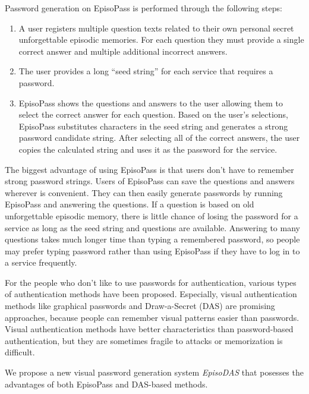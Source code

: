 \documentclass[sigconf]{acmart}
\begin{document}
Password generation on EpisoPass is performed through the following steps:

\begin{enumerate}
\item A user registers multiple question texts related to their own personal
secret unforgettable episodic memories. For each question they must provide
a single correct answer and multiple additional incorrect answers.

\item The user provides a long ``seed string'' for each service that requires
a password.

\item EpisoPass shows the questions and answers to the user allowing
them to select the correct answer for each question.
Based on the user's selections,
EpisoPass substitutes characters in the seed string and generates a
strong password candidate string.
After selecting all of the correct answers,
the user copies the calculated string
and uses it as the password for the service.
\end{enumerate}

The biggest advantage of using EpisoPass is that
users don't have to remember strong password strings.
%
Users of EpisoPass can save the questions and answers
wherever is convenient. They can
then easily generate passwords by running
EpisoPass and answering the questions.
%
If a question is based on old unforgettable episodic memory,
there is little chance of losing the password for a service
as long as the seed string and questions are available.
%
Answering to many questions takes much longer time than typing a
remembered password, so people may prefer typing password
rather than using EpisoPass if they have to log in to a service frequently.

For the people who don't like to use passwords for authentication,
various types of authentication methods have been proposed.
Especially, visual authentication methods
like graphical passwords \cite{Biddle:2012:GPL:2333112.2333114}\cite{GraphicalPasswords}
and Draw-a-Secret (DAS) \cite{Jermyn:1999:DAG:1251421.1251422} are promising approaches, because
people can remember visual patterns easier than passwords.
%
Visual authentication methods have better characteristics than
password-based authentication, but
they are sometimes fragile to attacks or memorization is difficult.

We propose a new visual password generation system \textit{EpisoDAS}
that posesses the advantages of both EpisoPass and DAS-based methods.
\end{document}
